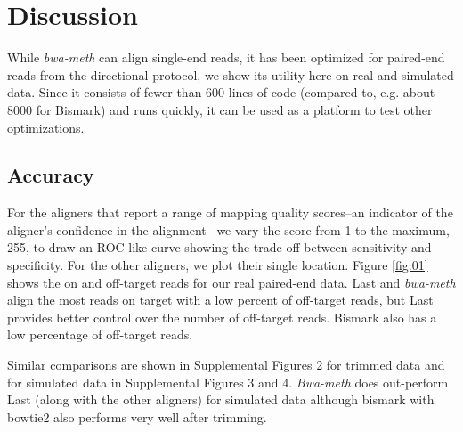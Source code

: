 \documentclass{bioinfo}
\begin{document}
\section{Discussion}

While \textit{bwa-meth} can align single-end reads, it has been optimized for
paired-end reads from the directional protocol, we show its utility here on real
and simulated data. Since it consists
of fewer than 600 lines of code (compared to, e.g. about 8000 for Bismark) and runs
quickly, it can be used as a platform to test other optimizations.

\subsection{Accuracy}
For the aligners that report a range of mapping quality
scores--an indicator of the aligner's confidence in the alignment--
we vary the score from 1 to the maximum, 255, to draw an ROC-like
curve showing the trade-off between sensitivity and specificity. For the
other aligners, we plot their single location. Figure \ref{fig:01} shows
the on and off-target reads for our real paired-end data. Last and 
\textit{bwa-meth} align the most reads on target with a low percent
of off-target reads, but Last provides better control over the number
of off-target reads. Bismark also has a low percentage of off-target reads.

Similar comparisons are shown in  Supplemental Figures 2
for trimmed data and for simulated data in Supplemental Figures 3 and 4.
\textit{Bwa-meth} does out-perform Last (along with the other aligners)
for simulated data although bismark with bowtie2 also performs very well
after trimming.
\end{document}
